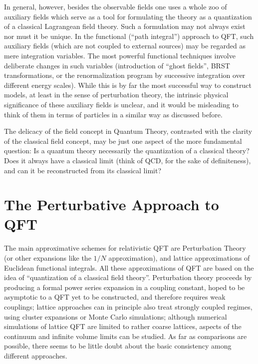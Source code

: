 \documentclass[multphys,vecphys]{svmult}
\begin{document}
In general, however, besides the observable fields one uses a whole
zoo of auxiliary fields which serve as a tool for formulating the
theory as a quantization of a classical Lagrangean
field theory. Such a formulation may not always exist nor must it be
unique. In the functional (``path
integral'') approach to QFT, such auxiliary fields (which are not
coupled to external sources) may be regarded as mere integration
variables. The most powerful functional techniques involve deliberate
changes in such variables (introduction of ``ghost 
fields'', BRST transformations, or the
renormalization program by successive
integration over different energy scales). While this is by far the
most successful way to construct models, at least in the sense of
perturbation theory, the intrinsic physical
significance of these auxiliary fields is unclear, and it would be
misleading to think of them in terms of particles in a
similar way as discussed before.   

The delicacy of the field concept in Quantum Theory, contrasted with the
clarity of the classical field concept, may be just one aspect of the more
fundamental question: Is a quantum theory necessarily the
quantization of a classical theory? Does it always
have a classical limit (think of QCD, for the sake of
definiteness), and can it be reconstructed from its classical limit? 

\section{The Perturbative Approach to QFT}\label{perturb}

The main approximative schemes for relativistic QFT are
Perturbation Theory (or other expansions
like the $1/N$ approximation), and lattice approximations of Euclidean
functional integrals. All these
approximations of QFT are based on the idea of
``quantization of a classical field
theory''. Perturbation theory proceeds by producing a formal power
series expansion in a coupling  constant, hoped to be asymptotic to a
QFT yet to be constructed, and therefore requires  weak couplings;
lattice approaches can in principle also
treat strongly coupled regimes, using cluster expansions or Monte Carlo
simulations; although numerical simulations of lattice QFT are limited 
to rather coarse lattices, aspects of the continuum and infinite volume
limits can be studied. As far as comparisons are possible, there seems
to be little doubt about the basic consistency among different approaches.
\end{document}
